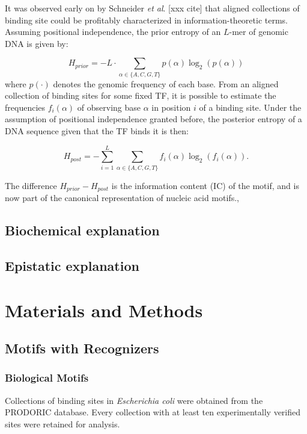 \documentclass{article}
\begin{document}
It was observed early on by Schneider \textit{et al}. [xxx cite] that
aligned collections of binding site could be profitably characterized
in information-theoretic terms.  Assuming positional independence, the
prior entropy of an $L$-mer of genomic DNA is given by:

\begin{equation}
  \label{eq:prior_entropy}
  H_{prior} = -L\cdot\sum_{\alpha\in \{A,C,G,T\}}p(\alpha)\log_2(p(\alpha))
\end{equation}
where $p(\cdot)$ denotes the genomic frequency of each base.  From an
aligned collection of binding sites for some fixed TF, it is possible
to estimate the frequencies $f_i(\alpha)$ of observing base $\alpha$
in position $i$ of a binding site.  Under the assumption of positional
independence granted before, the posterior entropy of a DNA sequence
given that the TF binds it is then:

\begin{equation}
  \label{eq:post_entropy}
  H_{post} = -\sum_{i=1}^L\sum_{\alpha\in \{A,C,G,T\}}f_i(\alpha)\log_2(f_i(\alpha)).
\end{equation}

The difference $H_{prior}-H_{post}$ is the information content (IC) of
the motif, and is now part of the canonical representation of nucleic
acid motifs.\cite{schneider90},\cite{weblogo}

\subsection{Biochemical explanation}
\subsection{Epistatic explanation}
\section{Materials and Methods}
\subsection{Motifs with Recognizers}
\subsubsection{Biological Motifs}
Collections of binding sites in \textit{Escherichia coli} were
obtained from the PRODORIC database.  Every collection with at least
ten experimentally verified sites were retained for analysis.
\end{document}
